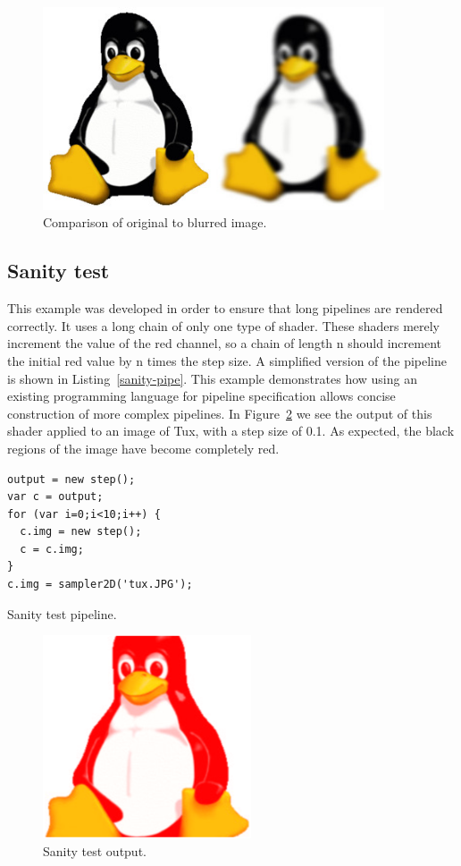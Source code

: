 \documentclass[12pt,twoside,notitlepage]{report}
\begin{document}
\begin{figure}
\centering
\includegraphics[height=60mm]{tux-blurred.JPG}
\caption{Comparison of original to blurred image.\label{gauss-img}}
\end{figure}

\subsection*{Sanity test}
This example was developed in order to ensure that long pipelines are rendered correctly. It uses a long chain of only one type of shader. These shaders merely increment the value of the red channel, so a chain of length n should increment the initial red value by n times the step size. A simplified version of the pipeline is shown in Listing~\ref{sanity-pipe}. This example demonstrates how using an existing programming language for pipeline specification allows concise construction of more complex pipelines. In Figure~\ref{sanity-img} we see the output of this shader applied to an image of Tux, with a step size of 0.1. As expected, the black regions of the image have become completely red.

\begin{listing}[H]
\begin{verbatim}
output = new step(); 
var c = output;
for (var i=0;i<10;i++) {
  c.img = new step();
  c = c.img;
}
c.img = sampler2D('tux.JPG');
\end{verbatim}
\caption{Sanity test pipeline.\label{sanity-pipe}}
\end{listing}

\begin{figure}
\centering
\includegraphics[height=60mm]{red-tux.png}
\caption{Sanity test output.\label{sanity-img}}
\end{figure}
\end{document}
